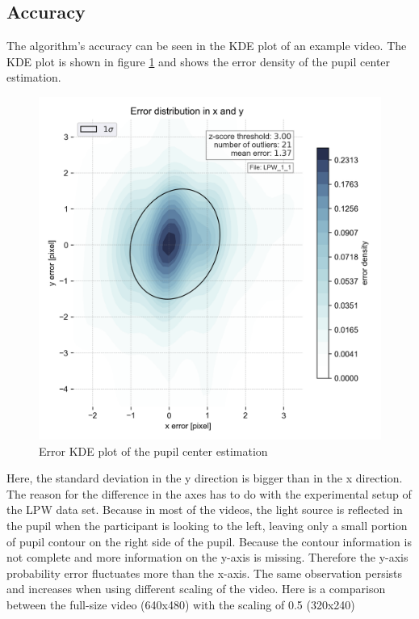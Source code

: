 \subsection{Accuracy}
The algorithm's accuracy can be seen in the KDE plot of an example video. The KDE plot is shown in figure \ref{fig:kde} and shows the error density of the pupil center estimation. 

\begin{figure}[h]
        \centering
        \includegraphics[width=\textwidth]{plots/LPW_1_1pre.png}
    \caption{Error KDE plot of the pupil center estimation}
    \label{fig:kde}
\end{figure}
Here, the standard deviation in the y direction is bigger than in the x direction. The reason for the difference in the axes has to do with the experimental setup of the LPW data set. Because in most of the videos, the light source is reflected in the pupil when the participant is looking to the left, leaving only a small portion of pupil contour on the right side of the pupil. Because the contour information is not complete and more information on the y-axis is missing. Therefore the y-axis probability error fluctuates more than the x-axis. The same observation persists and increases when using different scaling of the video. Here is a comparison between the full-size video (640x480) with the scaling of 0.5 (320x240) 
